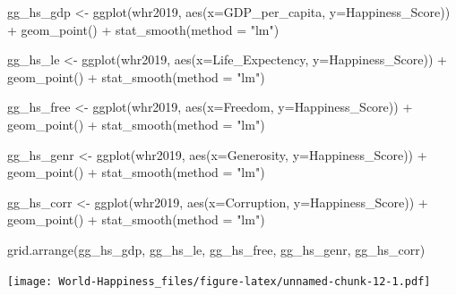 \documentclass[
]{article}
\newenvironment{Shaded}{\begin{snugshade}}{\end{snugshade}}
\newcommand{\AttributeTok}[1]{\textcolor[rgb]{0.77,0.63,0.00}{#1}}
\newcommand{\FunctionTok}[1]{\textcolor[rgb]{0.00,0.00,0.00}{#1}}
\newcommand{\NormalTok}[1]{#1}
\newcommand{\OtherTok}[1]{\textcolor[rgb]{0.56,0.35,0.01}{#1}}
\newcommand{\SpecialCharTok}[1]{\textcolor[rgb]{0.00,0.00,0.00}{#1}}
\newcommand{\StringTok}[1]{\textcolor[rgb]{0.31,0.60,0.02}{#1}}
\begin{document}
\begin{Shaded}
\begin{Highlighting}[]
\NormalTok{gg\_hs\_gdp }\OtherTok{\textless{}{-}} \FunctionTok{ggplot}\NormalTok{(whr2019, }\FunctionTok{aes}\NormalTok{(}\AttributeTok{x=}\NormalTok{GDP\_per\_capita, }\AttributeTok{y=}\NormalTok{Happiness\_Score)) }\SpecialCharTok{+}
  \FunctionTok{geom\_point}\NormalTok{() }\SpecialCharTok{+}
  \FunctionTok{stat\_smooth}\NormalTok{(}\AttributeTok{method =} \StringTok{"lm"}\NormalTok{)}

\NormalTok{gg\_hs\_le }\OtherTok{\textless{}{-}} \FunctionTok{ggplot}\NormalTok{(whr2019, }\FunctionTok{aes}\NormalTok{(}\AttributeTok{x=}\NormalTok{Life\_Expectency, }\AttributeTok{y=}\NormalTok{Happiness\_Score)) }\SpecialCharTok{+}
  \FunctionTok{geom\_point}\NormalTok{() }\SpecialCharTok{+}
  \FunctionTok{stat\_smooth}\NormalTok{(}\AttributeTok{method =} \StringTok{"lm"}\NormalTok{)}

\NormalTok{gg\_hs\_free }\OtherTok{\textless{}{-}} \FunctionTok{ggplot}\NormalTok{(whr2019, }\FunctionTok{aes}\NormalTok{(}\AttributeTok{x=}\NormalTok{Freedom, }\AttributeTok{y=}\NormalTok{Happiness\_Score)) }\SpecialCharTok{+}
  \FunctionTok{geom\_point}\NormalTok{() }\SpecialCharTok{+}
  \FunctionTok{stat\_smooth}\NormalTok{(}\AttributeTok{method =} \StringTok{"lm"}\NormalTok{)}

\NormalTok{gg\_hs\_genr }\OtherTok{\textless{}{-}} \FunctionTok{ggplot}\NormalTok{(whr2019, }\FunctionTok{aes}\NormalTok{(}\AttributeTok{x=}\NormalTok{Generosity, }\AttributeTok{y=}\NormalTok{Happiness\_Score)) }\SpecialCharTok{+}
  \FunctionTok{geom\_point}\NormalTok{() }\SpecialCharTok{+}
  \FunctionTok{stat\_smooth}\NormalTok{(}\AttributeTok{method =} \StringTok{"lm"}\NormalTok{)}

\NormalTok{gg\_hs\_corr }\OtherTok{\textless{}{-}} \FunctionTok{ggplot}\NormalTok{(whr2019, }\FunctionTok{aes}\NormalTok{(}\AttributeTok{x=}\NormalTok{Corruption, }\AttributeTok{y=}\NormalTok{Happiness\_Score)) }\SpecialCharTok{+}
  \FunctionTok{geom\_point}\NormalTok{() }\SpecialCharTok{+}
  \FunctionTok{stat\_smooth}\NormalTok{(}\AttributeTok{method =} \StringTok{"lm"}\NormalTok{)}

\FunctionTok{grid.arrange}\NormalTok{(gg\_hs\_gdp, gg\_hs\_le, gg\_hs\_free, gg\_hs\_genr, gg\_hs\_corr)}
\end{Highlighting}
\end{Shaded}

\texttt{[image: World-Happiness\_files/figure-latex/unnamed-chunk-12-1.pdf]}\\
\end{document}
